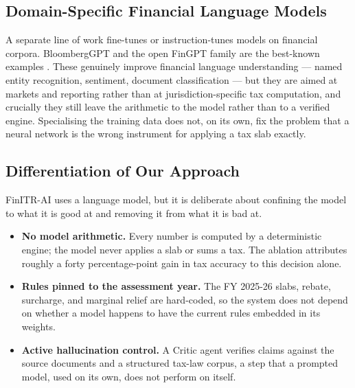 \subsection{Domain-Specific Financial Language Models}
A separate line of work fine-tunes or instruction-tunes models on financial
corpora. BloombergGPT and the open FinGPT family are the best-known examples
\cite{ref6}. These genuinely improve financial language understanding --- named
entity recognition, sentiment, document classification --- but they are aimed at
markets and reporting rather than at jurisdiction-specific tax computation, and
crucially they still leave the arithmetic to the model rather than to a verified
engine. Specialising the training data does not, on its own, fix the problem
that a neural network is the wrong instrument for applying a tax slab exactly.

\subsection{Differentiation of Our Approach}
FinITR-AI uses a language model, but it is deliberate about confining the model
to what it is good at and removing it from what it is bad at.

\begin{itemize}
    \item \textbf{No model arithmetic.} Every number is computed by a
          deterministic engine; the model never applies a slab or sums a tax.
          The ablation attributes roughly a forty percentage-point gain in tax
          accuracy to this decision alone.
    \item \textbf{Rules pinned to the assessment year.} The FY 2025-26 slabs,
          rebate, surcharge, and marginal relief are hard-coded, so the system
          does not depend on whether a model happens to have the current rules
          embedded in its weights.
    \item \textbf{Active hallucination control.} A Critic agent verifies claims
          against the source documents and a structured tax-law corpus, a step
          that a prompted model, used on its own, does not perform on itself.
\end{itemize}

